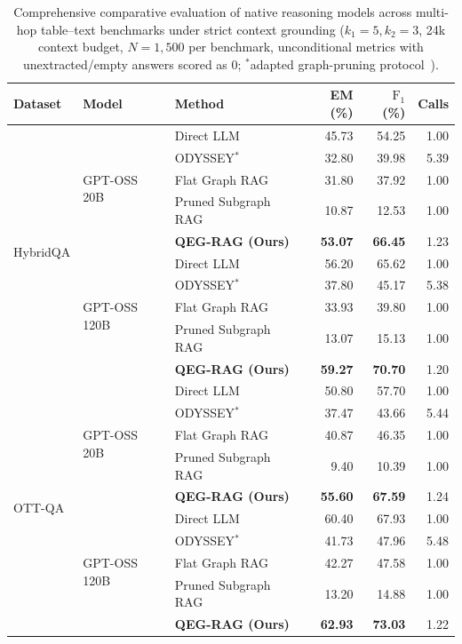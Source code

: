 \documentclass[runningheads]{llncs}
\begin{document}
\begin{table}[t]
\caption{Comprehensive comparative evaluation of native reasoning models across multi-hop table--text benchmarks under strict context grounding ($k_1=5, k_2=3$, 24k context budget, $N=1{,}500$ per benchmark, unconditional metrics with unextracted/empty answers scored as 0; $^*$adapted graph-pruning protocol~\cite{agarwal2025hybrid}).}
\label{tab:main-results}
\vspace{1.5mm}
\centering
\scriptsize
\renewcommand{\arraystretch}{0.88}
\setlength{\tabcolsep}{7pt}
\begin{tabular}{@{}lllrrr@{}}
\toprule
Dataset & Model & Method & EM (\%) & $\text{F}_1$ (\%) & Calls \\
\midrule
\multirow{10}{*}{HybridQA} & \multirow{5}{*}{GPT-OSS 20B}  
  & Direct LLM               & 45.73 & 54.25 & 1.00 \\
& & ODYSSEY$^*$~\cite{agarwal2025hybrid} & 32.80 & 39.98 & 5.39 \\
& & Flat Graph RAG           & 31.80 & 37.92 & 1.00 \\
& & Pruned Subgraph RAG      & 10.87 & 12.53 & 1.00 \\
& & \textbf{QEG-RAG (Ours)}  & \textbf{53.07} & \textbf{66.45} & 1.23 \\
\cmidrule{2-6}
& \multirow{5}{*}{GPT-OSS 120B} 
  & Direct LLM               & 56.20 & 65.62 & 1.00 \\
& & ODYSSEY$^*$~\cite{agarwal2025hybrid} & 37.80 & 45.17 & 5.38 \\
& & Flat Graph RAG           & 33.93 & 39.80 & 1.00 \\
& & Pruned Subgraph RAG      & 13.07 & 15.13 & 1.00 \\
& & \textbf{QEG-RAG (Ours)}  & \textbf{59.27} & \textbf{70.70} & 1.20 \\
\midrule
\multirow{10}{*}{OTT-QA}   & \multirow{5}{*}{GPT-OSS 20B}  
  & Direct LLM               & 50.80 & 57.70 & 1.00 \\
& & ODYSSEY$^*$~\cite{agarwal2025hybrid} & 37.47 & 43.66 & 5.44 \\
& & Flat Graph RAG           & 40.87 & 46.35 & 1.00 \\
& & Pruned Subgraph RAG      & 9.40  & 10.39 & 1.00 \\
& & \textbf{QEG-RAG (Ours)}  & \textbf{55.60} & \textbf{67.59} & 1.24 \\
\cmidrule{2-6}
& \multirow{5}{*}{GPT-OSS 120B} 
  & Direct LLM               & 60.40 & 67.93 & 1.00 \\
& & ODYSSEY$^*$~\cite{agarwal2025hybrid} & 41.73 & 47.96 & 5.48 \\
& & Flat Graph RAG           & 42.27 & 47.58 & 1.00 \\
& & Pruned Subgraph RAG      & 13.20 & 14.88 & 1.00 \\
& & \textbf{QEG-RAG (Ours)}  & \textbf{62.93} & \textbf{73.03} & 1.22 \\
\bottomrule
\end{tabular}
\vspace{1.0mm}
\end{table}
\end{document}

